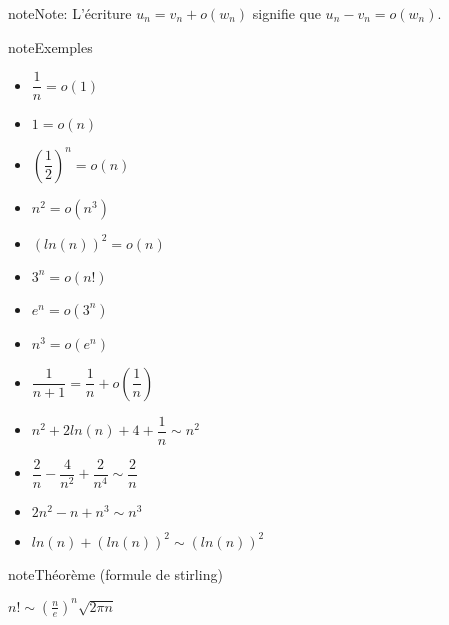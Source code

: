 \documentclass[letterpaper,10pt,french]{jupyterBook}
\begin{document}
\begin{sphinxadmonition}{note}{Note:}
\sphinxAtStartPar
L’écriture \(u_n = v_n + o(w_n)\) signifie que \(u_n-v_n = o(w_n)\).
\end{sphinxadmonition}

\begin{sphinxadmonition}{note}{Exemples}
\begin{itemize}
\item {} 
\sphinxAtStartPar
\(\dfrac{1}{n} = o(1)\)

\item {} 
\sphinxAtStartPar
\(1=o(n)\)

\item {} 
\sphinxAtStartPar
\((\dfrac{1}{2})^n = o(n)\)

\item {} 
\sphinxAtStartPar
\(n^2 = o(n^3)\)

\item {} 
\sphinxAtStartPar
\((ln(n))^2 = o(n)\)

\item {} 
\sphinxAtStartPar
\(3^n = o(n!)\)

\item {} 
\sphinxAtStartPar
\(e^n = o(3^n)\)

\item {} 
\sphinxAtStartPar
\(n^3 = o(e^n)\)

\item {} 
\sphinxAtStartPar
\(\dfrac{1}{n+1} = \dfrac{1}{n} + o(\dfrac{1}{n})\)

\item {} 
\sphinxAtStartPar
\(n^2 + 2ln(n) + 4 + \dfrac{1}{n} \sim n^2\)

\item {} 
\sphinxAtStartPar
\(\dfrac{2}{n} - \dfrac{4}{n^2} + \dfrac{2}{n^4} \sim \dfrac{2}{n}\)

\item {} 
\sphinxAtStartPar
\(2n^2 - n+n^3 \sim n^3\)

\item {} 
\sphinxAtStartPar
\(ln(n) + (ln(n))^2 \sim (ln(n))^2\)

\end{itemize}
\end{sphinxadmonition}

\begin{sphinxadmonition}{note}{Théorème (formule de stirling)}

\sphinxAtStartPar
\(n! \sim (\frac{n}{e})^n\sqrt{2\pi n}\)
\end{sphinxadmonition}
\end{document}
